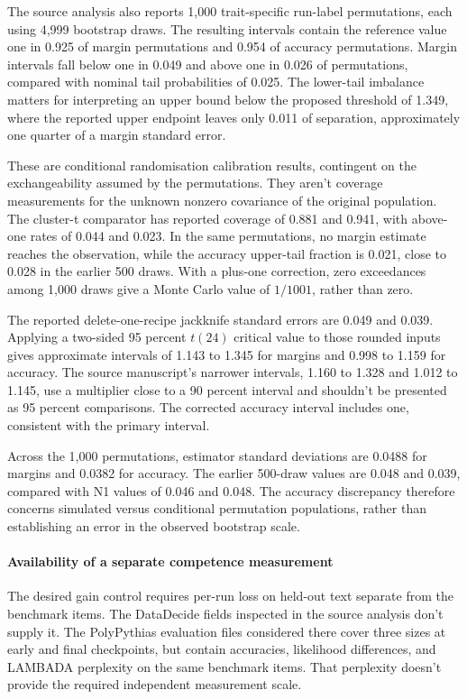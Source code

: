 The source analysis also reports 1,000 trait-specific run-label permutations, each using 4,999 bootstrap draws. The resulting intervals contain the reference value one in 0.925 of margin permutations and 0.954 of accuracy permutations. Margin intervals fall below one in 0.049 and above one in 0.026 of permutations, compared with nominal tail probabilities of 0.025. The lower-tail imbalance matters for interpreting an upper bound below the proposed threshold of 1.349, where the reported upper endpoint leaves only 0.011 of separation, approximately one quarter of a margin standard error.

These are conditional randomisation calibration results, contingent on the exchangeability assumed by the permutations. They aren't coverage measurements for the unknown nonzero covariance of the original population. The cluster-t comparator has reported coverage of 0.881 and 0.941, with above-one rates of 0.044 and 0.023. In the same permutations, no margin estimate reaches the observation, while the accuracy upper-tail fraction is 0.021, close to 0.028 in the earlier 500 draws. With a plus-one correction, zero exceedances among 1,000 draws give a Monte Carlo value of $1/1001$, rather than zero.

The reported delete-one-recipe jackknife standard errors are 0.049 and 0.039. Applying a two-sided 95 percent $t(24)$ critical value to those rounded inputs gives approximate intervals of 1.143 to 1.345 for margins and 0.998 to 1.159 for accuracy. The source manuscript's narrower intervals, 1.160 to 1.328 and 1.012 to 1.145, use a multiplier close to a 90 percent interval and shouldn't be presented as 95 percent comparisons. The corrected accuracy interval includes one, consistent with the primary interval.

Across the 1,000 permutations, estimator standard deviations are 0.0488 for margins and 0.0382 for accuracy. The earlier 500-draw values are 0.048 and 0.039, compared with N1 values of 0.046 and 0.048. The accuracy discrepancy therefore concerns simulated versus conditional permutation populations, rather than establishing an error in the observed bootstrap scale.

\paragraph{Availability of a separate competence measurement}
The desired gain control requires per-run loss on held-out text separate from the benchmark items. The DataDecide fields inspected in the source analysis don't supply it. The PolyPythias evaluation files considered there cover three sizes at early and final checkpoints, but contain accuracies, likelihood differences, and LAMBADA perplexity on the same benchmark items. That perplexity doesn't provide the required independent measurement scale.

